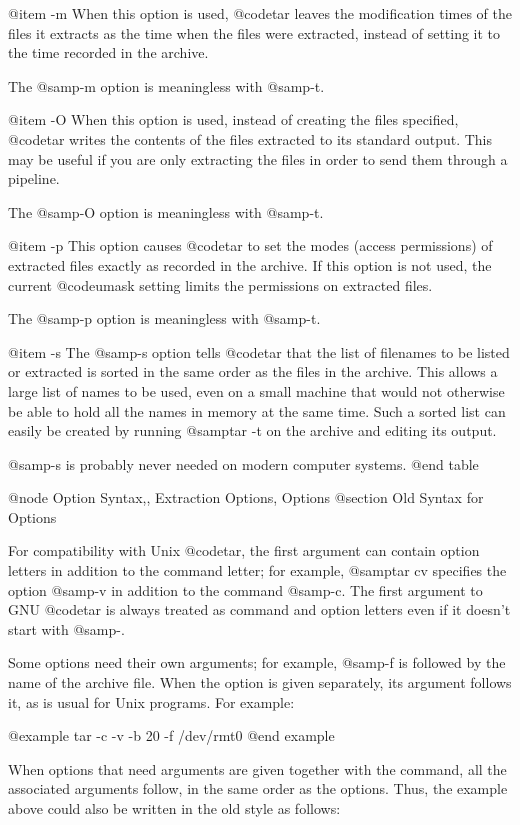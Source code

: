 @item -m
When this option is used, @code{tar} leaves the modification times of
the files it extracts as the time when the files were extracted,
instead of setting it to the time recorded in the archive.

The @samp{-m} option is meaningless with @samp{-t}.

@item -O
When this option is used, instead of creating the files
specified, @code{tar} writes the contents of the files
extracted to its standard output.  This may be useful if you
are only extracting the files in order to send them through a
pipeline.

The @samp{-O} option is meaningless with @samp{-t}.

@item -p
This option causes @code{tar} to set the modes (access permissions) of
extracted files exactly as recorded in the archive.  If this option is
not used, the current @code{umask} setting limits the permissions on
extracted files.

The @samp{-p} option is meaningless with @samp{-t}.

@item -s
The @samp{-s} option tells @code{tar} that the list of filenames to be
listed or extracted is sorted in the same order as the files in the
archive.  This allows a large list of names to be used, even on a
small machine that would not otherwise be able to hold all the names
in memory at the same time.  Such a sorted list can easily be created
by running @samp{tar -t} on the archive and editing its output.

@samp{-s} is probably never needed on modern computer systems.
@end table

@node Option Syntax,, Extraction Options, Options
@section Old Syntax for Options

For compatibility with Unix @code{tar}, the first argument can contain
option letters in addition to the command letter; for example, @samp{tar
cv} specifies the option @samp{-v} in addition to the command @samp{-c}.
The first argument to GNU @code{tar} is always treated as command and
option letters even if it doesn't start with @samp{-}.

Some options need their own arguments; for example, @samp{-f} is followed
by the name of the archive file.  When the option is given separately, its
argument follows it, as is usual for Unix programs.  For example:

@example
tar -c -v -b 20 -f /dev/rmt0
@end example

When options that need arguments are given together with the command, all
the associated arguments follow, in the same order as the options.  Thus,
the example above could also be written in the old style as follows:

